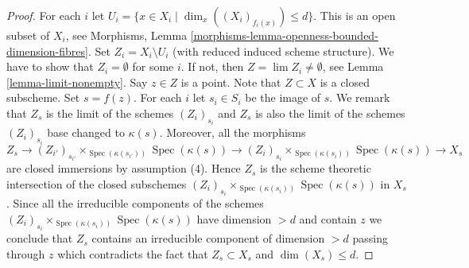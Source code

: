 \documentclass[10pt,a4paper]{amsart}
\theoremstyle{plain}
\theoremstyle{definition}
\theoremstyle{remark}
\numberwithin{equation}{subsection}
\def\lim{\mathop{\mathrm{lim}}\nolimits}
\def\Spec{\mathop{\mathrm{Spec}}}
\begin{document}
\begin{proof}
For each $i$ let $U_i = \{x \in X_i \mid \dim_x((X_i)_{f_i(x)}) \leq d\}$.
This is an open subset of $X_i$, see
Morphisms, Lemma \ref{morphisms-lemma-openness-bounded-dimension-fibres}.
Set $Z_i = X_i \setminus U_i$ (with reduced induced scheme structure).
We have to show that $Z_i = \emptyset$ for some $i$.
If not, then $Z = \lim Z_i \not = \emptyset$, see
Lemma \ref{lemma-limit-nonempty}.
Say $z \in Z$ is a point. Note that $Z \subset X$ is a closed subscheme.
Set $s = f(z)$. For each $i$ let $s_i \in S_i$ be the image
of $s$. We remark that $Z_s$ is the limit of the schemes $(Z_i)_{s_i}$
and $Z_s$ is also the limit of the schemes $(Z_i)_{s_i}$ base
changed to $\kappa(s)$. Moreover, all the morphisms
$$
Z_s
\longrightarrow
(Z_{i'})_{s_{i'}} \times_{\Spec(\kappa(s_{i'}))} \Spec(\kappa(s))
\longrightarrow
(Z_i)_{s_i} \times_{\Spec(\kappa(s_i))} \Spec(\kappa(s))
\longrightarrow
X_s
$$
are closed immersions by assumption (4). Hence $Z_s$ is the scheme
theoretic intersection of the closed subschemes
$(Z_i)_{s_i} \times_{\Spec(\kappa(s_i))} \Spec(\kappa(s))$
in $X_s$. Since all the irreducible components of the schemes
$(Z_i)_{s_i} \times_{\Spec(\kappa(s_i))} \Spec(\kappa(s))$
have dimension $> d$ and contain $z$ we conclude that
$Z_s$ contains an irreducible component of dimension $> d$ passing
through $z$ which contradicts the fact that $Z_s \subset X_s$ and
$\dim(X_s) \leq d$.
\end{proof}
\end{document}
